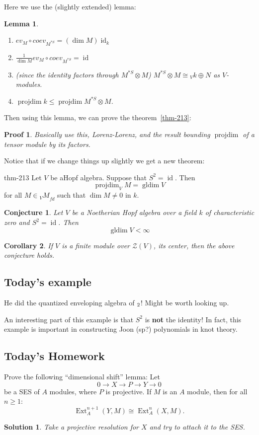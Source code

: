 \documentclass[12pt]{article}
\theoremstyle{break}
\theoremstyle{nonumberbreak}
\newtheorem{sol}{Solution}
\theoremstyle{changebreak}
\newtheorem{thm}{Theorem}[subsection]
\newtheorem{lem}[thm]{Lemma}
\newtheorem{cor}[thm]{Corollary}
\newenvironment{thm-prime}[1]
  {\renewcommand{\thethm}{\ref{#1}$'$}%
   \addtocounter{thm}{-1}%
   \begin{thm}}
  {\end{thm}}
\theoremstyle{break}
\theoremstyle{nonumberbreak}
\newtheorem{prf}{Proof}
\theoremstyle{nonumberplain}
\newtheorem{conj}{Conjecture}
\theoremstyle{change}
\DeclareMathOperator{\Ext}{Ext}
\DeclareMathOperator{\gldim}{gldim}
\DeclareMathOperator{\projdim}{projdim}
\DeclareMathOperator{\id}{id}
\begin{document}
Here we use the (slightly extended) lemma:
\begin{lem}
	\begin{enumerate}
		\item $ev_M\circ coev_{M^{*S}}=(\dim M)\id_k$
		\item $\frac{1}{\dim M}ev_M\circ coev_{M^{*S}}=\id$
		\item (since the identity factors through $M^{*S}\otimes M$) $M^{*S}\otimes M\cong {_Vk}\oplus N$ as $V$-modules.
		\item $\projdim k\le \projdim M^{*S}\otimes M$.
	\end{enumerate}
\end{lem}
Then using this lemma, we can prove the theorem~\ref{thm-213}:
\begin{prf}
	Basically use this, Lorenz-Lorenz, and the result bounding $\projdim$ of a tensor module by its factors.
\end{prf}

Notice that if we change things up slightly we get a new theorem:
\begin{thm-prime}{thm-213}
	Let $V$ be aHopf algebra. Suppose that $S^2=\id$. Then 
	\[\projdim_V M=\gldim V\]
	for all $M\in {_VM}_{fd}$ such that $\dim M\ne 0$ in $k$.
\end{thm-prime}

\begin{conj}
	Let $V$ be a Noetherian Hopf algebra over a field $k$ of characteristic zero and $S^2=\id$.
	Then
	\[\gldim V <\infty\]
\end{conj}

\begin{cor}
	If $V$ is a finite module over $\mathcal Z(V)$, its center, then the above conjecture holds.
\end{cor}

\subsection{Today's example}
He did the quantized enveloping algebra of $\sl_2$! Might be worth looking up.

An interesting part of this example is that $S^2$ is \textbf{not} the identity! In fact, 
this example is important in constructing Joon (sp?) polynomials in knot theory.

\subsection{Today's Homework}
\begin{prob}
	Prove the following ``dimensional shift'' lemma: Let
	\[0\to X\to P\to Y\to 0\]
	be a SES of $A$ modules, where $P$ is projective. If $M$ is an $A$ module, then for all $n\ge 1$:
	\[\Ext_A^{n+1}(Y,M)\cong\Ext^{n}_A(X,M).\]
\end{prob}
\begin{sol}
	Take a projective resolution for $X$ and try to attach it to the SES.
\end{sol}
\end{document}
